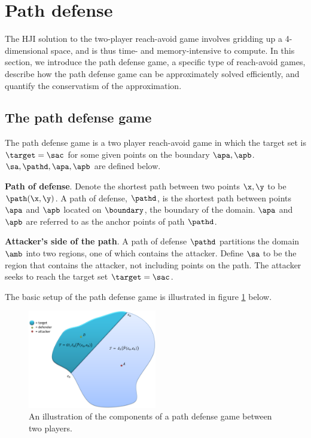 \section{Path defense}
\label{sec:path_defense}
The HJI solution to the two-player reach-avoid game involves gridding up a 4-dimensional space, and is thus time- and memory-intensive to compute. In this section, we introduce the path defense game, a specific type of reach-avoid games, describe how the path defense game can be approximately solved efficiently, and quantify the conservatism of the approximation. 

\subsection{The path defense game}
The path defense game is a two player reach-avoid game in which the target set is $\target=\sac$ for some given points on the boundary $\apa,\apb$. $\sa,\pathd,\apa,\apb$ are defined below.

\begin{defn} %
\textbf{Path of defense}. Denote the shortest path between two points $\x,\y$ to be $\path(\x,\y)$. A path of defense, $\pathd$, is the shortest path between points $\apa$ and $\apb$ located on $\boundary$, the boundary of the domain. $\apa$ and $\apb$ are referred to as the anchor points of path $\pathd$. 
\end{defn}

\begin{defn} %
\textbf{Attacker's side of the path}. A path of defense $\pathd$ partitions the domain $\amb$ into two regions, one of which contains the attacker. Define $\sa$ to be the region that contains the attacker, not including points on the path. The attacker seeks to reach the target set $\target=\sac$.
\end{defn}

The basic setup of the path defense game is illustrated in figure \ref{fig:pd_form} below.
\begin{figure}[h]
\centering
\includegraphics[width=0.5\textwidth]{"fig/pd game formulation"}
\caption{An illustration of the components of a path defense game between two players.}
\label{fig:pd_form}
\end{figure}

